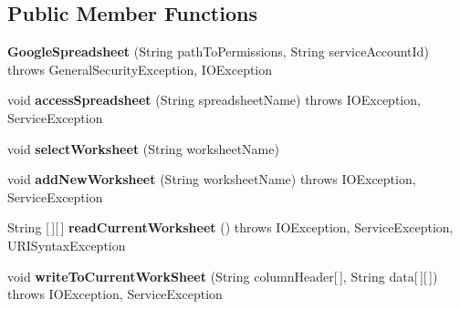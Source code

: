 \subsection*{Public Member Functions}
\begin{DoxyCompactItemize}
\item 
\hypertarget{classcom_1_1zeuslearning_1_1automation_1_1io_1_1GoogleSpreadsheet_a0e8932dc29a39cb0690c8d31666363fe}{}\label{classcom_1_1zeuslearning_1_1automation_1_1io_1_1GoogleSpreadsheet_a0e8932dc29a39cb0690c8d31666363fe} 
{\bfseries Google\+Spreadsheet} (String path\+To\+Permissions, String service\+Account\+Id)  throws General\+Security\+Exception, I\+O\+Exception 
\item 
\hypertarget{classcom_1_1zeuslearning_1_1automation_1_1io_1_1GoogleSpreadsheet_a31bd3b1678468cd9f966a7dd4fa6be3b}{}\label{classcom_1_1zeuslearning_1_1automation_1_1io_1_1GoogleSpreadsheet_a31bd3b1678468cd9f966a7dd4fa6be3b} 
void {\bfseries access\+Spreadsheet} (String spreadsheet\+Name)  throws I\+O\+Exception, Service\+Exception 
\item 
\hypertarget{classcom_1_1zeuslearning_1_1automation_1_1io_1_1GoogleSpreadsheet_a7f7048902c6d2b90f69e12a884ab212b}{}\label{classcom_1_1zeuslearning_1_1automation_1_1io_1_1GoogleSpreadsheet_a7f7048902c6d2b90f69e12a884ab212b} 
void {\bfseries select\+Worksheet} (String worksheet\+Name)
\item 
\hypertarget{classcom_1_1zeuslearning_1_1automation_1_1io_1_1GoogleSpreadsheet_a95e91c697034787b1ef85013051f50cf}{}\label{classcom_1_1zeuslearning_1_1automation_1_1io_1_1GoogleSpreadsheet_a95e91c697034787b1ef85013051f50cf} 
void {\bfseries add\+New\+Worksheet} (String worksheet\+Name)  throws I\+O\+Exception, Service\+Exception 
\item 
\hypertarget{classcom_1_1zeuslearning_1_1automation_1_1io_1_1GoogleSpreadsheet_a22ff8c2c09277728cd2a302aa058c563}{}\label{classcom_1_1zeuslearning_1_1automation_1_1io_1_1GoogleSpreadsheet_a22ff8c2c09277728cd2a302aa058c563} 
String \mbox{[}$\,$\mbox{]}\mbox{[}$\,$\mbox{]} {\bfseries read\+Current\+Worksheet} ()  throws I\+O\+Exception, Service\+Exception, U\+R\+I\+Syntax\+Exception 
\item 
\hypertarget{classcom_1_1zeuslearning_1_1automation_1_1io_1_1GoogleSpreadsheet_a1df2cd06a5de0212780fbc1873435ac4}{}\label{classcom_1_1zeuslearning_1_1automation_1_1io_1_1GoogleSpreadsheet_a1df2cd06a5de0212780fbc1873435ac4} 
void {\bfseries write\+To\+Current\+Work\+Sheet} (String column\+Header\mbox{[}$\,$\mbox{]}, String data\mbox{[}$\,$\mbox{]}\mbox{[}$\,$\mbox{]})  throws I\+O\+Exception, Service\+Exception 

\end{DoxyCompactItemize}
